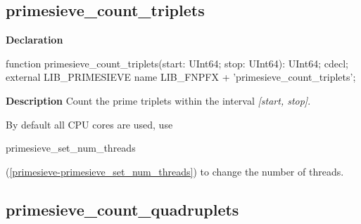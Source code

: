 \documentclass{report}
\newif\ifpdf
\begin{document}
\subsection*{primesieve{\_}count{\_}triplets}
\fi
\label{primesieve-primesieve_count_triplets}
\begin{list}{}{
\setlength{\itemindent}{0cm}
\setlength{\listparindent}{0cm}
\setlength{\leftmargin}{\evensidemargin}
\addtolength{\leftmargin}{\tmplength}
\settowidth{\labelsep}{X}
\addtolength{\leftmargin}{\labelsep}
\setlength{\labelwidth}{\tmplength}
}
\item[\textbf{Declaration}\hfill]
\ifpdf
\begin{flushleft}
\fi
\begin{ttfamily}
function primesieve{\_}count{\_}triplets(start: UInt64; stop: UInt64): UInt64; cdecl; external LIB{\_}PRIMESIEVE name LIB{\_}FNPFX + 'primesieve{\_}count{\_}triplets';\end{ttfamily}

\ifpdf
\end{flushleft}
\fi

\par
\item[\textbf{Description}]
Count the prime triplets within the interval \textit{[start, stop]}.

By default all CPU cores are used, use \begin{ttfamily}primesieve{\_}set{\_}num{\_}threads\end{ttfamily}(\ref{primesieve-primesieve_set_num_threads}) to change the number of threads.

\end{list}
\ifpdf
\subsection*{\large{\textbf{primesieve{\_}count{\_}quadruplets}}\normalsize\hspace{1ex}\hrulefill}
\else
\end{document}
